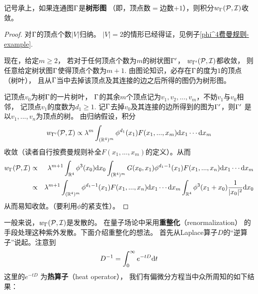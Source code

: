 \begin{prop}记号承上，如果连通图$\Gamma$是\textbf{树形图}
（即，顶点数$=$边数$+1$），则积分$w_\Gamma(\mathcal{P},\mathcal{I})$收敛。
\end{prop}

\begin{proof}
对$\Gamma$的顶点个数$|V|$归纳。
$|V|=2$的情形已经得证，见例子\ref{phi^4费曼规则-example}.

现在，给定$m\geq 2$，
若对于任何顶点个数为$m$的树状图$\Gamma'$，
$w_{\Gamma'}(\mathcal{P},\mathcal{I})$都收敛，
则任意给定树状图$\Gamma$使得顶点个数为$m+1$.
由图论知识，必存在$\Gamma$的度为$1$的顶点（树叶），
且从$\Gamma$当中去掉该顶点及其连接的边之后所得的图仍为树形图。

记顶点$v_0$为树$\Gamma$的一片树叶，
$\Gamma$的其余$m$个顶点记为$v_1,v_2,...,v_m$，不妨$v_1$与$v_0$相邻，
记顶点$v_1$的度数为$d_1\geq 1$.
记$\Gamma$去掉$v_0$及其连接的边所得到的图为$\Gamma'$，则$\Gamma'$
是以$v_1,...,v_n$为顶点的树。
由归纳假设，积分
$$
  w_{\Gamma'}(\mathcal{P},\mathcal{I})
\propto
  \lambda^m
  \int_{(\mathbb{R}^4)^m}
    \phi^{d_1}(x_1)F(x_1,...,x_m)
    \mathrm{d} x_1\cdots\mathrm{d} x_m
$$
收敛（读者自行按费曼规则补全$F(x_1,...,x_m)$的定义）。从而
\begin{eqnarray*}
     w_\Gamma(\mathcal{P},\mathcal{I})
&\propto&
     \lambda^{m+1}
     \int_{\mathbb{R}^4}
       \phi^3(x_0)
       \mathrm{d} x_0
     \int_{(\mathbb{R}^4)^{m}}
       G(x_0,x_1)
       \phi^{d_1-1}(x_1)
       F(x_1,...,x_n)
       \mathrm{d} x_1\cdots\mathrm{d} x_m\\
&\propto&
     \lambda^{m+1}
     \int_{(\mathbb{R}^4)^{m}}
       \phi^{d_1-1}(x_1)
       F(x_1,...,x_n)
       \mathrm{d} x_1\cdots\mathrm{d} x_m
     \int_{\mathbb{R}^4}
       \phi^3(x_1+x_0)
       \frac{1}{|x_0|^2}
       \mathrm{d} x_0
\end{eqnarray*}
从而易知收敛。（要利用$\phi$的紧支性）。
\end{proof}


一般来说，$w_\Gamma(\mathcal{P},\mathcal{I})$是发散的。
在量子场论中采用\textbf{重整化}（renormalization）
的手段处理这种紫外发散。下面介绍重整化的想法。
首先从Laplace算子$D$的“逆算子”说起。注意到
$$D^{-1}=\int_0^\infty e^{-tD}\mathrm{d} t$$
这里的$e^{-tD}$ 为\textbf{热算子}（heat operator），
我们有偏微分方程当中众所周知的如下结果：

